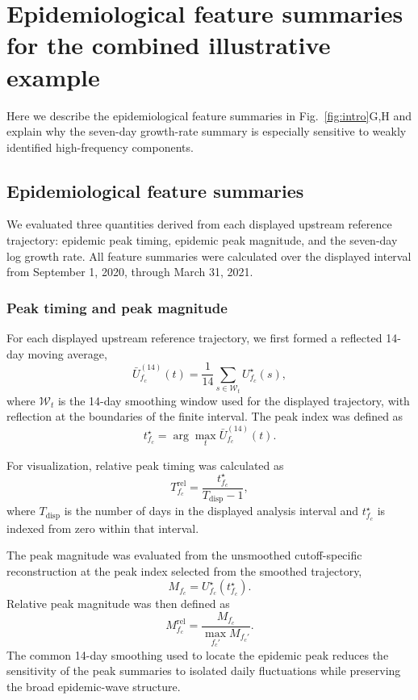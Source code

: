 \renewcommand{\thesection}{S\arabic{section}}
\setcounter{section}{2}

\section{Epidemiological feature summaries for the combined illustrative example}
\label{sec:Appendix_S3}

Here we describe the epidemiological feature summaries in Fig.~\ref{fig:intro}G,H and explain why the seven-day growth-rate summary is especially sensitive to weakly identified high-frequency components.

\subsection{Epidemiological feature summaries}
\label{sec:appendix_feature_summaries}

We evaluated three quantities derived from each displayed upstream reference
trajectory: epidemic peak timing, epidemic peak magnitude, and the seven-day
log growth rate. All feature summaries were calculated over the displayed
interval from September 1, 2020, through March 31, 2021.

\subsubsection{Peak timing and peak magnitude}

For each displayed upstream reference trajectory, we first formed a reflected
14-day moving average,
\[
\bar U^{(14)}_{f_c}(t)
=
\frac{1}{14}
\sum_{s\in\mathcal W_t}
U^\star_{f_c}(s),
\]
where \(\mathcal W_t\) is the 14-day smoothing window used for the displayed trajectory, with reflection at the boundaries of the finite interval.
The peak index was defined as
\[
t^\star_{f_c}
=
\arg\max_t
\bar U^{(14)}_{f_c}(t).
\]

For visualization, relative peak timing was calculated as
\[
T^{\mathrm{rel}}_{f_c}
=
\frac{t^\star_{f_c}}
{T_{\mathrm{disp}}-1},
\]
where \(T_{\mathrm{disp}}\) is the number of days in the displayed analysis
interval and \(t^\star_{f_c}\) is indexed from zero within that interval.

The peak magnitude was evaluated from the unsmoothed cutoff-specific
reconstruction at the peak index selected from the smoothed trajectory,
\[
M_{f_c}
=
U^\star_{f_c}(t^\star_{f_c}).
\]
Relative peak magnitude was then defined as
\[
M^{\mathrm{rel}}_{f_c}
=
\frac{M_{f_c}}
{\max_{f_c'}M_{f_c'}}.
\]
The common 14-day smoothing used to locate the epidemic peak reduces the
sensitivity of the peak summaries to isolated daily fluctuations while
preserving the broad epidemic-wave structure.


